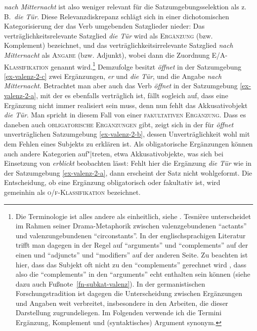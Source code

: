 {\it nach Mitternacht} ist also weniger relevant für die Satzumgebungsselektion als z.\,B.\ {\it die Tür}. Diese Relevanzdiskrepanz schlägt sich in einer dichotomischen Kategorisierung der das Verb umgebenden Satzglieder nieder: Das verträglichkeitsrelevante Satzglied {\it die Tür} wird als \textsc{Ergänzung} (bzw. Komplement) bezeichnet, und das verträglichkeitsirrelevante Satzglied {\it nach Mitternacht} als \textsc{Angabe} (bzw. Adjunkt), wobei dann die Zuordnung \textsc{E/A-Klassifikation} genannt wird.\footnote{Die Terminologie ist alles andere als einheitlich, siehe \citet[766]{Storrer:03}. Tesni\`ere unterscheidet im Rahmen seiner Drama-Metaphorik zwischen valenzgebundenen "`actants"' und valenzungebundenen "`circonstants"'. In der englischsprachigen Literatur trifft man dagegen in der Regel auf "`arguments"' und "`complements"' auf der einen und "`adjuncts"' und "`modifiers"' auf der anderen Seite. Zu beachten ist hier, dass das Subjekt oft nicht zu den "`complements"' gerechnet wird \citep[25]{Mueller:10}, dass also die "`complements"' in den "`arguments"' echt enthalten sein können (siehe dazu auch Fu\ss note~\ref{fn-subkat-valenz}). In der germanistischen Forschungstradition ist dagegen die Unterscheidung zwischen Ergänzungen und Angaben weit verbreitet, insbesondere in den Arbeiten, die dieser Darstellung zugrundeliegen. Im Folgenden verwende ich die Termini Ergänzung, Komplement und (syntaktisches) Argument synonym.} Demzufolge besitzt {\it öffnet} in der Satzumgebung \ref{ex-valenz-2-c} zwei Ergänzungen, {\it er} und {\it die Tür}, und die Angabe {\it nach Mitternacht}. Betrachtet man aber auch das Verb {\it öffnet} in der Satzumgebung \ref{ex-valenz-2-a}, mit der es ebenfalls verträglich ist, fällt sogleich auf, dass eine Ergänzung nicht immer realisiert sein muss, denn nun fehlt das Akkusativobjekt {\it die Tür}. Man spricht in diesem Fall von einer \textsc{fakultativen Ergänzung}. Dass es daneben auch \textsc{obligatorische Ergänzungen} gibt, zeigt sich in der für {\it öffnet} unverträglichen Satzumgebung \ref{ex-valenz-2-b}, dessen Unverträglichkeit wohl mit dem Fehlen eines Subjekts zu erklären ist. Als obligatorische Ergänzungen können auch andere Kategorien auf"|treten, etwa Akkusativobjekte, was sich bei Einsetzung von {\it erblickt} beobachten lässt: Fehlt hier die Ergänzung {\it die Tür} wie in der Satzumgebung \ref{ex-valenz-2-a}, dann erscheint der Satz nicht wohlgeformt. Die Entscheidung, ob eine Ergänzung obligatorisch oder fakultativ ist, wird gemeinhin als \textsc{o/f-Klassifikation} bezeichnet. 

